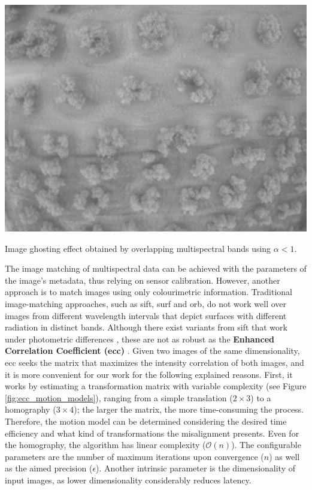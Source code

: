 \begin{marginfigure}[.2cm]
  \includegraphics{figs/image_fusion/multispectral_ghost_effect.png}
  \caption{Image ghosting effect obtained by overlapping multispectral bands using $\alpha < 1$.}
  \label{fig:multispectral_ghost_effect}
\end{marginfigure}
The image matching of multispectral data can be achieved with the parameters of the image's metadata, thus relying on sensor calibration. However, another approach is to match images using only colourimetric information. Traditional image-matching approaches, such as \acrshort{sift}, \acrshort{surf} and \acrshort{orb}, do not work well over images from different wavelength intervals that depict surfaces with different radiation in distinct bands. Although there exist variants from \acrshort{sift} that work under photometric differences \cite{park_pi-sift_2008}, these are not as robust as the \textbf{Enhanced Correlation Coefficient (\acrshort{ecc})} \cite{evangelidis_parametric_2008}. Given two images of the same dimensionality, \acrshort{ecc} seeks the matrix that maximizes the intensity correlation of both images, and it is more convenient for our work for the following explained reasons. First, it works by estimating a transformation matrix with variable complexity (see Figure \ref{fig:ecc_motion_models}), ranging from a simple translation ($2 \times 3$) to a homography ($3 \times 4$); the larger the matrix, the more time-consuming the process. Therefore, the motion model can be determined considering the desired time efficiency and what kind of transformations the misalignment presents. Even for the homography, the algorithm has linear complexity ($\mathcal{O}(n)$). The configurable parameters are the number of maximum iterations upon convergence ($n$) as well as the aimed precision ($\epsilon$). Another intrinsic parameter is the dimensionality of input images, as lower dimensionality considerably reduces latency.

